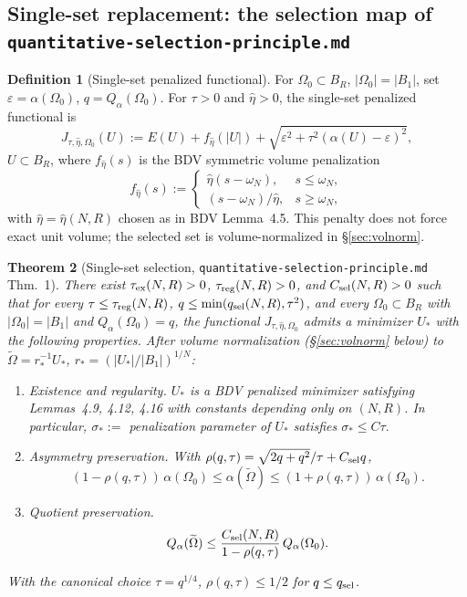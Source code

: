 \documentclass[11pt]{article}
\newtheorem{theorem}{Theorem}
\theoremstyle{definition}
\newtheorem{definition}[theorem]{Definition}
\newcommand{\abs}[1]{\left|#1\right|}
\begin{document}
\subsection{Single-set replacement: the selection map of
\texttt{quantitative-selection-principle.md}}

\begin{definition}[Single-set penalized functional]\label{def:penal}
For $\Omega_0\subset B_R$, $\abs{\Omega_0}=\abs{B_1}$, set
$\varepsilon=\alpha(\Omega_0)$, $q=Q_\alpha(\Omega_0)$. For
$\tau>0$ and $\hat\eta>0$, the single-set penalized functional is
\[
J_{\tau,\hat\eta,\Omega_0}(U)
:=E(U)+f_{\hat\eta}(\abs U)
+\sqrt{\varepsilon^2+\tau^2(\alpha(U)-\varepsilon)^2},
\]
$U\subset B_R$, where $f_{\hat\eta}(s)$ is the BDV symmetric volume
penalization
\[
f_{\hat\eta}(s):=
\begin{cases}
\hat\eta(s-\omega_N),&s\le\omega_N,\\
(s-\omega_N)/\hat\eta,&s\ge\omega_N,
\end{cases}
\]
with $\hat\eta=\hat\eta(N,R)$ chosen as in BDV Lemma~4.5. This penalty does
not force exact unit volume; the selected set is volume-normalized in
\S\ref{sec:volnorm}.
\end{definition}

\begin{theorem}[Single-set selection, \texttt{quantitative-selection-principle.md} Thm.~1]\label{thm:selection}
There exist $\tau_{\rm ex}(N,R)>0$, $\tau_{\rm reg}(N,R)>0$, and
$C_{\rm sel}(N,R)>0$ such that for every $\tau\le\tau_{\rm reg}(N,R)$,
$q\le\min(q_{\rm sel}(N,R),\tau^2)$, and every $\Omega_0\subset B_R$ with
$\abs{\Omega_0}=\abs{B_1}$ and $Q_\alpha(\Omega_0)=q$, the functional
$J_{\tau,\hat\eta,\Omega_0}$ admits a minimizer $U_*$ with the following
properties. After volume normalization (\S\ref{sec:volnorm} below) to
$\widetilde\Omega=r_*^{-1}U_*$, $r_*=(\abs{U_*}/\abs{B_1})^{1/N}$:
\begin{enumerate}
\item \emph{Existence and regularity.} $U_*$ is a BDV penalized minimizer
satisfying Lemmas~4.9, 4.12, 4.16 with constants depending only on
$(N,R)$. In particular, $\sigma_*:=$ penalization parameter of $U_*$
satisfies
\(
\sigma_*\le C\tau.
\)
\item \emph{Asymmetry preservation.} With
$\rho(q,\tau)=\sqrt{2q+q^2}/\tau+C_{\rm sel}q$,
\[
(1-\rho(q,\tau))\,\alpha(\Omega_0)
\le \alpha(\widetilde\Omega)
\le (1+\rho(q,\tau))\,\alpha(\Omega_0).
\]
\item \emph{Quotient preservation.}
\[
Q_\alpha(\widetilde\Omega)\le\frac{C_{\rm sel}(N,R)}{1-\rho(q,\tau)}\,Q_\alpha(\Omega_0).
\]
\end{enumerate}
With the canonical choice $\tau=q^{1/4}$, $\rho(q,\tau)\le1/2$ for
$q\le q_{\rm sel}$.
\end{theorem}
\end{document}
